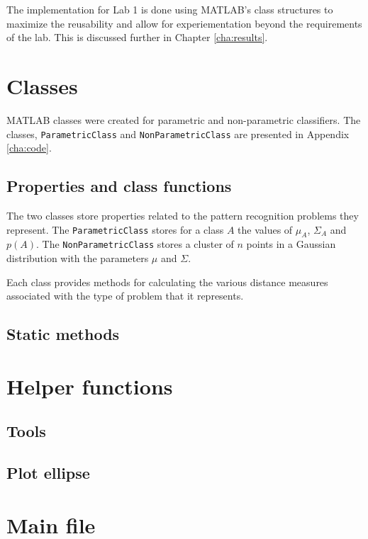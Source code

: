The implementation for Lab 1 is done using MATLAB's class structures to
maximize the reusability and allow for experiementation beyond the requirements
of the lab. This is discussed further in Chapter \ref{cha:results}.

\section{Classes}
MATLAB classes were created for parametric and non-parametric classifiers. The
classes, {\tt ParametricClass} and {\tt NonParametricClass} are presented in
Appendix \ref{cha:code}.
\subsection{Properties and class functions}
The two classes store properties related to the pattern recognition problems
they represent. The {\tt ParametricClass} stores for a class $A$ the values of
$\mu_A$, $\Sigma_A$ and $p(A)$. The {\tt NonParametricClass} stores a cluster
of $n$ points in a Gaussian distribution with the parameters $\mu$
and $\Sigma$.

Each class provides methods for calculating the various distance measures
associated with the type of problem that it represents.

\subsection{Static methods}

\section{Helper functions}
\subsection{Tools}
\subsection{Plot ellipse}

\section{Main file}